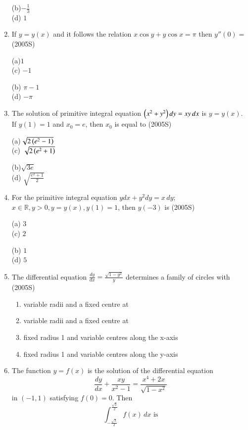 \documentclass[journal,12pt,twocolumn]{IEEEtran}
\theoremstyle{remark}
\begin{document}
\begin{enumerate}
\begin{multicols}{2}
(b)$-\frac{1}{3}$  \\(d)  $1$
\end{multicols}

\item If $y = y(x)$ and it follows the relation $x \cos y + y \cos x = \pi$ then $y''(0) =$ \hfill (2005S)

\begin{multicols}{2}
(a)$1$\\ (c) $-1$
\columnbreak

(b) $\pi - 1$ \\(d) $-\pi$  
\end{multicols}

\item The solution of primitive integral equation $\left(x^2 + y^2\right)dy = xy \, dx$ is $y = y(x)$. If $y(1) = 1$ and $x_0 = e$, then $x_0$ is equal to \hfill (2005S)

\begin{multicols}{2}
(a)$\sqrt{2\left(e^2 - 1\right)}$ \\ (c) $\sqrt{2\left(e^2 + 1\right)}$
\columnbreak

(b)$\sqrt{3e}$  \\(d) $\sqrt{\frac{e^2 + 1}{2}}$
\end{multicols}

\item For the primitive integral equation $y dx + y^2 dy = x \, dy$; $x \in \mathbb{R}, y > 0, y = y(x), y(1) = 1$, then $y(-3)$ is \hfill (2005S)

\begin{multicols}{2}
(a) $3$ \\ (c) $2$
\columnbreak

(b) $1$   \\(d) $5$
\end{multicols}

\item The differential equation $\frac{dy}{dx} = \frac{\sqrt{1-y^2}}{y}$ determines a family of circles with \hfill (2005S)
\begin{enumerate}[label=(\alph*)]
    \item [(a)] variable radii and a fixed centre at 
    \item [(b)] variable radii and a fixed centre at 
    \item [(c)] fixed radius 1 and variable centres along the x-axis
    \item [(d)] fixed radius 1 and variable centres along the y-axis
\end{enumerate}
\item The function $y = f(x)$ is the solution of the differential equation
\[
\frac{dy}{dx} + \frac{xy}{x^2-1} = \frac{x^4 + 2x}{\sqrt{1-x^2}}
\]
in $(-1, 1)$ satisfying $f(0) = 0$. Then
\[
\int_{-\frac{\sqrt{3}}{2}}^{\frac{\sqrt{3}}{2}} f(x) \, dx \text{ is}
\]


\end{enumerate}
\end{document}
